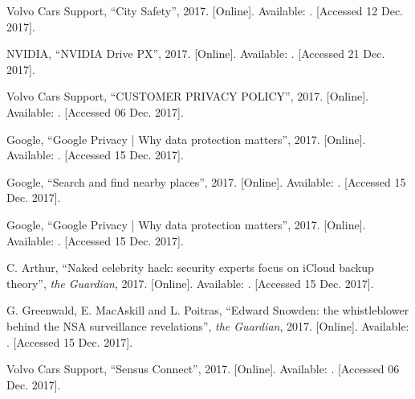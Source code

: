 \documentclass[conference]{IEEEtran}
\begin{document}
\begin{thebibliography}{00}
	Volvo Cars Support,
	``City Safety'',
	2017.
	[Online]. Available: .
	[Accessed 12 Dec. 2017].
	
	NVIDIA,
	``NVIDIA Drive PX'',
	2017.
	[Online]. Available:
	.
	[Accessed 21 Dec. 2017].
	
	Volvo Cars Support,
	``CUSTOMER PRIVACY POLICY'',
	2017.
	[Online]. Available:
	.
	[Accessed 06 Dec. 2017].
	
	Google, 
	``Google Privacy | Why data protection matters'',
	2017.
	[Online]. Available:
	.
	[Accessed 15 Dec. 2017].
	
	Google,
	``Search and find nearby places'',
	2017.
	[Online]. Available: .
	[Accessed 15 Dec. 2017].
	
	Google,
	``Google Privacy | Why data protection matters'',
	2017.
	[Online]. Available:
	.
	[Accessed 15 Dec. 2017].
	
	C. Arthur,
	``Naked celebrity hack: security experts focus on iCloud backup theory'',
	\emph{the Guardian},
	2017.
	[Online]. Available: .
	[Accessed 15 Dec. 2017].
	
	G. Greenwald, E. MacAskill and L. Poitras,
	``Edward Snowden: the whistleblower behind the NSA surveillance revelations'',
	\emph{the Guardian},
	2017.
	[Online]. Available: .
	[Accessed 15 Dec. 2017].
	
	Volvo Cars Support,
	``Sensus Connect'',
	2017.
	[Online]. Available: .
	[Accessed 06 Dec. 2017].
	
	

\end{thebibliography}
\end{document}
